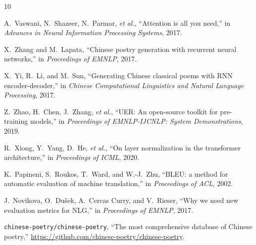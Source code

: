 \documentclass[11pt,a4paper]{article}
\begin{document}
\begin{thebibliography}{10}

A.~Vaswani, N.~Shazeer, N.~Parmar, \emph{et al.},
``Attention is all you need,''
in \emph{Advances in Neural Information Processing Systems}, 2017.

X.~Zhang and M.~Lapata,
``Chinese poetry generation with recurrent neural networks,''
in \emph{Proceedings of EMNLP}, 2017.

X.~Yi, R.~Li, and M.~Sun,
``Generating Chinese classical poems with RNN encoder-decoder,''
in \emph{Chinese Computational Linguistics and Natural Language Processing}, 2017.

Z.~Zhao, H.~Chen, J.~Zhang, \emph{et al.},
``UER: An open-source toolkit for pre-training models,''
in \emph{Proceedings of EMNLP-IJCNLP: System Demonstrations}, 2019.

R.~Xiong, Y.~Yang, D.~He, \emph{et al.},
``On layer normalization in the transformer architecture,''
in \emph{Proceedings of ICML}, 2020.

K.~Papineni, S.~Roukos, T.~Ward, and W.-J.~Zhu,
``BLEU: a method for automatic evaluation of machine translation,''
in \emph{Proceedings of ACL}, 2002.

J.~Novikova, O.~Dušek, A.~Cercas Curry, and V.~Rieser,
``Why we need new evaluation metrics for NLG,''
in \emph{Proceedings of EMNLP}, 2017.

\texttt{chinese-poetry/chinese-poetry},
``The most comprehensive database of Chinese poetry,''
\url{https://github.com/chinese-poetry/chinese-poetry}.

\end{thebibliography}
\end{document}
